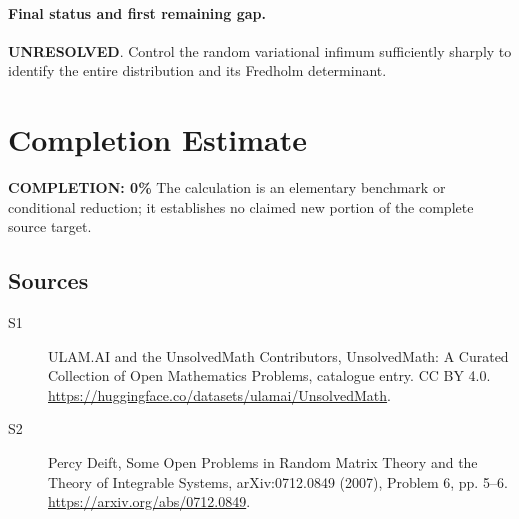 \documentclass[11pt]{article}
\begin{document}
\paragraph{Final status and first remaining gap.}
\textbf{UNRESOLVED}. Control the random variational infimum sufficiently sharply to identify the entire distribution and its Fredholm determinant.

\section{Completion Estimate}
\noindent\textbf{COMPLETION: 0\%}
The calculation is an elementary benchmark or conditional reduction; it establishes no claimed new portion of the complete source target.

\subsection{Sources}
\begin{description}
\item[\hypertarget{source:statement:1}{S1}] ULAM.AI and the UnsolvedMath Contributors, UnsolvedMath: A Curated Collection of Open Mathematics Problems, catalogue entry. CC BY 4.0. \url{https://huggingface.co/datasets/ulamai/UnsolvedMath}.
\item[\hypertarget{source:statement:2}{S2}] Percy Deift, Some Open Problems in Random Matrix Theory and the Theory of Integrable Systems, arXiv:0712.0849 (2007), Problem 6, pp. 5--6. \url{https://arxiv.org/abs/0712.0849}.
\end{description}
\label{end:statement}
\end{document}
